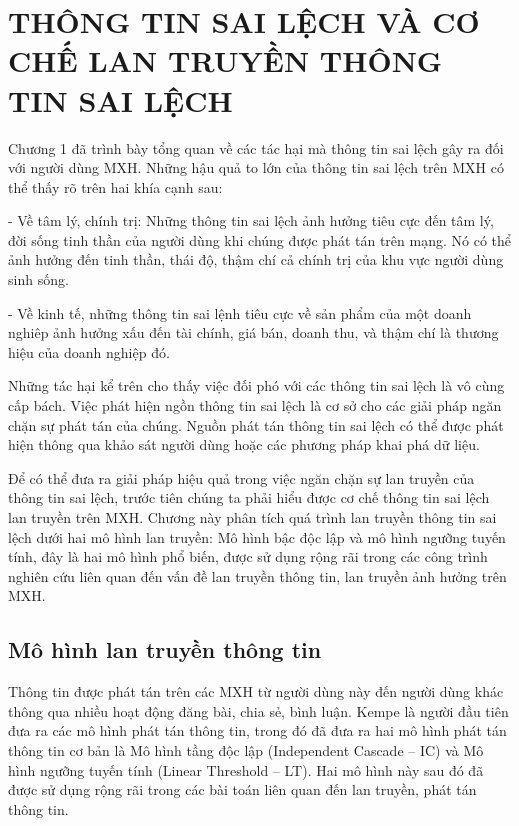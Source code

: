 \chapter{THÔNG TIN SAI LỆCH VÀ CƠ CHẾ LAN TRUYỀN THÔNG TIN SAI LỆCH}
\thispagestyle{fancy}
\label{chap:2}
Chương 1 đã trình bày tổng quan về các tác hại mà thông tin sai lệch gây ra đối với người dùng MXH. Những hậu quả to lớn của thông tin sai lệch trên MXH có thể thấy rõ trên hai khía cạnh sau: 

- Về tâm lý, chính trị: Những thông tin sai lệch ảnh hưởng tiêu cực đến tâm lý, đời sống tinh thần của người dùng khi chúng được phát tán trên mạng. Nó có thể ảnh hưởng đến tinh thần, thái độ, thậm chí cả chính trị của khu vực người dùng sinh sống. 

- Về kinh tế, những thông tin sai lệnh tiêu cực về sản phẩm của một doanh nghiêp ảnh hưởng xấu đến tài chính, giá bán, doanh thu, và thậm chí là thương hiệu của doanh nghiệp đó. 

Những tác hại kể trên cho thấy việc đối phó với các thông tin sai lệch là vô cùng cấp bách. Việc phát hiện ngồn thông tin sai lệch là cơ sở cho các giải pháp ngăn chặn sự phát tán của chúng. Nguồn phát tán thông tin sai lệch có thể được phát hiện thông qua khảo sát người dùng hoặc các phương pháp khai phá dữ liệu.

Để có thể đưa ra giải pháp hiệu quả trong việc ngăn chặn sự lan truyền của thông tin sai lệch, trước tiên chúng ta phải hiểu được cơ chế thông tin sai lệch lan truyền trên MXH. Chương này phân tích quá trình lan truyền thông tin sai lệch dưới hai mô hình lan truyền: Mô hình bậc độc lập và mô hình ngưỡng tuyến tính, đây là hai mô hình phổ biến, được sử dụng rộng rãi trong các công trình nghiên cứu liên quan đến vấn đề lan truyền thông tin, lan truyền ảnh hưởng trên MXH.


\section{Mô hình lan truyền thông tin}
Thông tin được phát tán trên các MXH từ người dùng này đến người dùng khác thông qua nhiều hoạt động đăng bài, chia sẻ, bình luận. Kempe \cite{kemple1} là người đầu tiên đưa ra các mô hình phát tán thông tin, trong đó đã đưa ra hai mô hình phát tán thông tin cơ bản là Mô hình tầng độc lập (Independent Cascade – IC) và Mô hình ngưỡng tuyến tính (Linear Threshold – LT). Hai mô hình này sau đó đã được sử dụng rộng rãi trong các bài toán liên quan đến lan truyền, phát tán thông tin.

